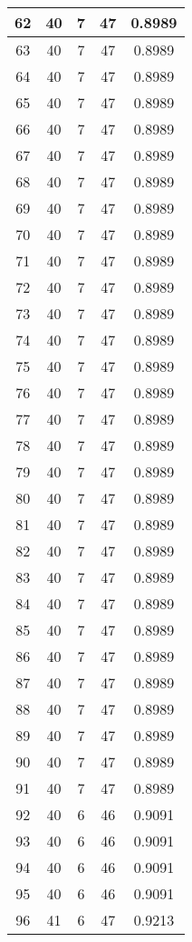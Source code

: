 \documentclass[letterpaper, 12pt]{article}
\begin{document}
\begin{longtable}{|c|c|c|c|c|}
\hline
62 & 40 & 7 & 47 & 0.8989 \\
\hline
63 & 40 & 7 & 47 & 0.8989 \\
\hline
64 & 40 & 7 & 47 & 0.8989 \\
\hline
65 & 40 & 7 & 47 & 0.8989 \\
\hline
66 & 40 & 7 & 47 & 0.8989 \\
\hline
67 & 40 & 7 & 47 & 0.8989 \\
\hline
68 & 40 & 7 & 47 & 0.8989 \\
\hline
69 & 40 & 7 & 47 & 0.8989 \\
\hline
70 & 40 & 7 & 47 & 0.8989 \\
\hline
71 & 40 & 7 & 47 & 0.8989 \\
\hline
72 & 40 & 7 & 47 & 0.8989 \\
\hline
73 & 40 & 7 & 47 & 0.8989 \\
\hline
74 & 40 & 7 & 47 & 0.8989 \\
\hline
75 & 40 & 7 & 47 & 0.8989 \\
\hline
76 & 40 & 7 & 47 & 0.8989 \\
\hline
77 & 40 & 7 & 47 & 0.8989 \\
\hline
78 & 40 & 7 & 47 & 0.8989 \\
\hline
79 & 40 & 7 & 47 & 0.8989 \\
\hline
80 & 40 & 7 & 47 & 0.8989 \\
\hline
81 & 40 & 7 & 47 & 0.8989 \\
\hline
82 & 40 & 7 & 47 & 0.8989 \\
\hline
83 & 40 & 7 & 47 & 0.8989 \\
\hline
84 & 40 & 7 & 47 & 0.8989 \\
\hline
85 & 40 & 7 & 47 & 0.8989 \\
\hline
86 & 40 & 7 & 47 & 0.8989 \\
\hline
87 & 40 & 7 & 47 & 0.8989 \\
\hline
88 & 40 & 7 & 47 & 0.8989 \\
\hline
89 & 40 & 7 & 47 & 0.8989 \\
\hline
90 & 40 & 7 & 47 & 0.8989 \\
\hline
91 & 40 & 7 & 47 & 0.8989 \\
\hline
92 & 40 & 6 & 46 & 0.9091 \\
\hline
93 & 40 & 6 & 46 & 0.9091 \\
\hline
94 & 40 & 6 & 46 & 0.9091 \\
\hline
95 & 40 & 6 & 46 & 0.9091 \\
\hline
96 & 41 & 6 & 47 & 0.9213 \\

\end{longtable}
\end{document}
